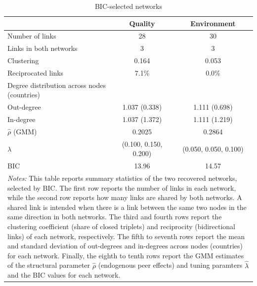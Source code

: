 \begin{table}[H]\centering
\caption{BIC-selected networks}\label{tab:network_eu}
\begin{tabular}{lcc}\hline\hline
& Quality & Environment \\\hline
Number of links & 28 & 30 \\
Links in both networks & 3 & 3 \\
Clustering & 0.164 & 0.053 \\
Reciprocated links & 7.1\% & 0.0\% \\
Degree distribution across nodes (countries) & & \\
\quad Out-degree & 1.037 (0.338) & 1.111 (0.698) \\
\quad In-degree & 1.037 (1.372) & 1.111 (1.219) \\
\hline
$\hat{\rho}$ (GMM) & 0.2025 & 0.2864 \\
$\lambda$ & (0.100, 0.150, 0.200) & (0.050, 0.050, 0.100) \\
BIC & 13.96 & 14.57 \\
\hline\hline
\multicolumn{3}{p{0.95\textwidth}}{\footnotesize \textit{Notes:} This table reports summary statistics of the two recovered networks, selected by BIC. The first row reports the number of links in each network, while the second row reports how many links are shared by both networks. A shared link is intended when there is a link between the same two nodes in the same direction in both networks. The third and fourth rows report the clustering coefficient (share of closed triplets) and reciprocity (bidirectional links) of each network, respectively. The fifth to seventh rows report the mean and standard deviation of out-degrees and in-degrees across nodes (countries) for each network. Finally, the eighth to tenth rows report the GMM estimates of the structural parameter $\hat{\rho}$ (endogenous peer effects) and tuning paramters $\hat{\lambda}$ and the BIC values for each network.} \\
\end{tabular}\end{table}
